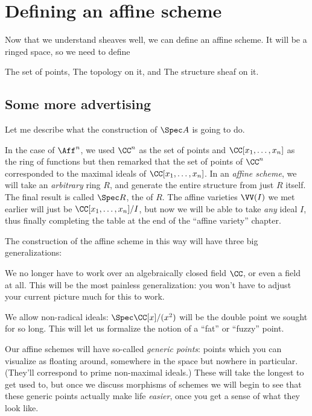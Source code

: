 \chapter{Defining an affine scheme}
Now that we understand sheaves well,
we can define an affine scheme.
It will be a ringed space, so we need to define
\begin{itemize}
	\ii The set of points,
	\ii The topology on it, and
	\ii The structure sheaf on it.
\end{itemize}

\section{Some more advertising}
Let me describe what the construction of $\Spec A$ is going to do.

In the case of $\Aff^n$, we used $\CC^n$ as the set of points
and $\CC[x_1, \dots, x_n]$ as the ring of functions
but then remarked that the set of points
of $\CC^n$ corresponded to the maximal ideals of $\CC[x_1, \dots, x_n]$.
In an \emph{affine scheme}, we will take an \emph{arbitrary} ring $R$,
and generate the entire structure from just $R$ itself.
The final result is called $\Spec R$, the  of $R$.
The affine varieties $\VV(I)$ we met earlier will just be
$\CC[x_1, \dots, x_n] / I$, but now we will be able to take
\emph{any} ideal $I$, thus finally completing the table at the end
of the ``affine variety'' chapter.

The construction of the affine scheme in this way
will have three big generalizations:
\begin{enumerate}
	\ii We no longer have to work over an algebraically
	closed field $\CC$, or even a field at all.
	This will be the most painless generalization:
	you won't have to adjust your current picture much for this to work.

	\ii We allow non-radical ideals:
	$\Spec \CC[x] / (x^2)$ will be the double point
	we sought for so long.
	This will let us formalize the notion of a ``fat'' or ``fuzzy'' point.

	\ii Our affine schemes will have so-called \emph{generic points}:
	points which you can visualize as floating around,
	somewhere in the space but nowhere in particular.
	(They'll correspond to prime non-maximal ideals.)
	These will take the longest to get used to,
	but once we discuss morphisms of schemes
	we will begin to see that these generic points actually make life
	\emph{easier}, once you get a sense of what they look like.
\end{enumerate}

